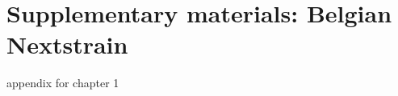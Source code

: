 \chapter{Supplementary materials: Belgian Nextstrain}
\label{appendixA}

appendix for chapter 1

\cleardoublepage

